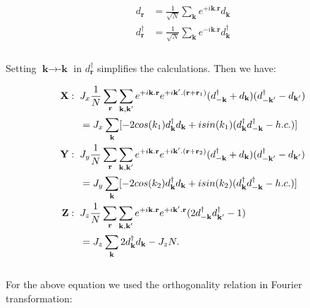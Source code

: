 \documentclass{article}
\begin{document}
\begin{equation}\label{eq:13}
	\begin{aligned}
		d_{\textbf{r}} &= \frac{1}{\sqrt{N}}\sum_\textbf{k} e^{+i\textbf{k}.\textbf{r}}d_{\textbf{k}} \\
		d^\dagger_{\textbf{r}} &= \frac{1}{\sqrt{N}}\sum_\textbf{k} e^{-i\textbf{k}.\textbf{r}}d^\dagger_{\textbf{k}} \\
	\end{aligned}
\end{equation}\\

\noindent Setting $\textbf{k} \rightarrow \textbf{-k}$ in $d^\dagger_\textbf{r}$ simplifies the calculations. Then we have:

\begin{equation}\label{eq:14}
	\begin{aligned}
		\textbf{X}: \hspace{2mm} &J_x\frac{1}{N}\sum_\textbf{r}\sum_{\textbf{k},\textbf{k}'}e^{+i\textbf{k}.\textbf{r}}e^{+i\textbf{k}'.(\textbf{r}+\textbf{r}_1)}(d^\dagger_{-\textbf{k}} + d_{\textbf{k}})(d^\dagger_{-\textbf{k}'} - d_{\textbf{k}'})\\
		&= J_x\sum_{\textbf{k}} [-2cos(k_1)d^\dagger_{\textbf{k}}d_{\textbf{k}} + isin(k_1)(d^\dagger_{\textbf{k}}d^\dagger_{-\textbf{k}}-h.c.)]\\
		\textbf{Y}: \hspace{2mm} &J_y\frac{1}{N}\sum_\textbf{r}\sum_{\textbf{k},\textbf{k}'}e^{+i\textbf{k}.\textbf{r}}e^{+i\textbf{k}'.(\textbf{r}+\textbf{r}_2)}(d^\dagger_{-\textbf{k}} + d_{\textbf{k}})(d^\dagger_{-\textbf{k}'} - d_{\textbf{k}'})\\
		&= J_y\sum_{\textbf{k}} [-2cos(k_2)d^\dagger_{\textbf{k}}d_{\textbf{k}} + isin(k_2)(d^\dagger_{\textbf{k}}d^\dagger_{-\textbf{k}}-h.c.)]\\
		\textbf{Z}: \hspace{2mm} &J_z\frac{1}{N}\sum_\textbf{r}\sum_{\textbf{k},\textbf{k}'}e^{+i\textbf{k}.\textbf{r}}e^{+i\textbf{k}'.\textbf{r}}(2d^\dagger_{-\textbf{k}}d^\dagger_{\textbf{k}'}-1)\\
		&= J_z\sum_{\textbf{k}} 2d^\dagger_{\textbf{k}}d_{\textbf{k}}-J_zN.\\
	\end{aligned}
\end{equation}\\

\noindent For the above equation we used the orthogonality relation in Fourier transformation:
\end{document}
